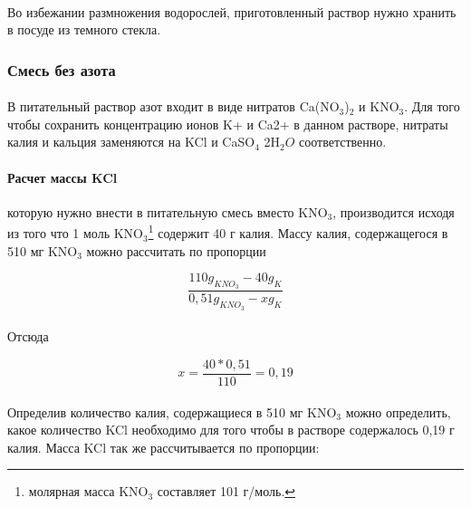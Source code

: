 \paragraph*{\warningsign}Во избежании размножения водорослей, приготовленный раствор нужно хранить в посуде из темного стекла.
	
\subsubsection*{Смесь без азота}
	
\paragraph*{}В питательный раствор азот входит в виде нитратов Ca(NO${_3}$)${_2}$ и KNO$_3$. Для того чтобы сохранить концентрацию ионов K+ и Ca2+ в данном растворе, нитраты калия и кальция заменяются на KCl и CaSO${_4}$ \textperiodcentered 2H${_2}O$ соответственно.
	
	\paragraph*{Расчет массы \hypertarget{potashyum_mass}{KCl}} которую нужно внести в питательную смесь вместо KNO$_3$, производится исходя из того что 1 моль KNO$_3$\footnote{молярная масса KNO$_3$ составляет 101 г/моль.} содержит 40 г калия. Массу калия, содержащегося в 510 мг KNO$_3$ можно  рассчитать по пропорции
	
	\begin{equation}
		\frac{110 g_{KNO_3} - 40 g_{K}}{0,51 g_{KNO_3} - x g_{K}}
	\end{equation}	 

\paragraph*{}Отсюда	

\begin{equation}
		x = \frac{40 * 0,51}{110} = 0,19
	\end{equation}
	
\paragraph*{}Определив количество калия, содержащиеся в 510 мг KNO$_3$ можно определить, какое количество KCl необходимо для того чтобы в растворе содержалось 0,19 г калия. Масса KCl так же рассчитывается по пропорции:

